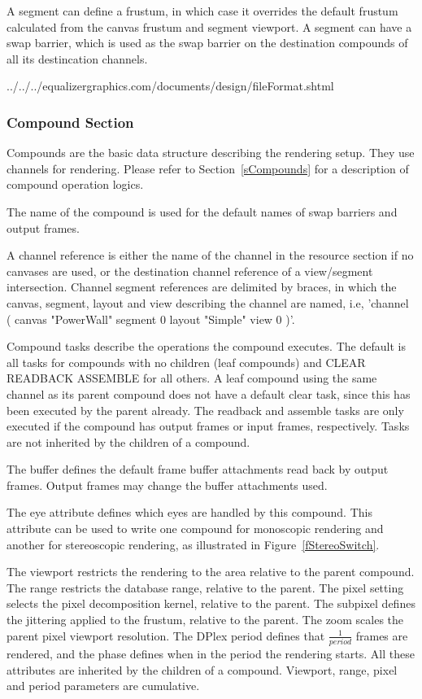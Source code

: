 \documentclass[10pt,a4]{scrartcl}
\newcommand{\fig}[1]{Figure~\ref{#1}}
\newcommand{\sref}[1]{Section~\ref{#1}}
\begin{document}
A segment can define a frustum, in which case it overrides the default
frustum calculated from the canvas frustum and segment viewport. A segment can
have a swap barrier, which is used as the swap barrier on the destination
compounds of all its destincation channels.

{\footnotesize
  {../../../equalizergraphics.com/documents/design/fileFormat.shtml}}

\subsubsection{Compound Section}

Compounds are the basic data structure describing the rendering
setup. They use channels for rendering. Please refer to
\sref{sCompounds} for a description of compound operation logics.

The name of the compound is used for the default names of swap barriers
and output frames.

A channel reference is either the name of the channel in the resource
section if no canvases are used, or the destination channel reference of
a view/segment intersection. Channel segment references are delimited by
braces, in which the canvas, segment, layout and view describing the
channel are named, i.e, 'channel ( canvas "PowerWall" segment 0 layout
"Simple" view 0 )'.

Compound tasks describe the operations the compound executes. The default is all
tasks for compounds with no children (leaf compounds) and \textsf{CLEAR READBACK
  ASSEMBLE} for all others. A leaf compound using the same channel as its parent
compound does not have a default clear task, since this has been executed by the
parent already. The readback and assemble tasks are only executed if the
compound has output frames or input frames, respectively. Tasks are not
inherited by the children of a compound.

The buffer defines the default frame buffer attachments read back by
output frames. Output frames may change the buffer attachments used.

The eye attribute defines which eyes are handled by this compound. This
attribute can be used to write one compound for monoscopic rendering and another
for stereoscopic rendering, as illustrated in \fig{fStereoSwitch}.

The viewport restricts the rendering to the area relative to the parent
compound. The range restricts the database range, relative to the
parent. The pixel setting selects the pixel decomposition kernel,
relative to the parent. The subpixel defines the jittering applied to
the frustum, relative to the parent. The zoom scales the parent
pixel viewport resolution. The DPlex period defines that $\frac{1}{period}$
frames are rendered, and the phase defines when in the period the
rendering starts. All these attributes are inherited by the children of
a compound. Viewport, range, pixel and period parameters are cumulative.
\end{document}
